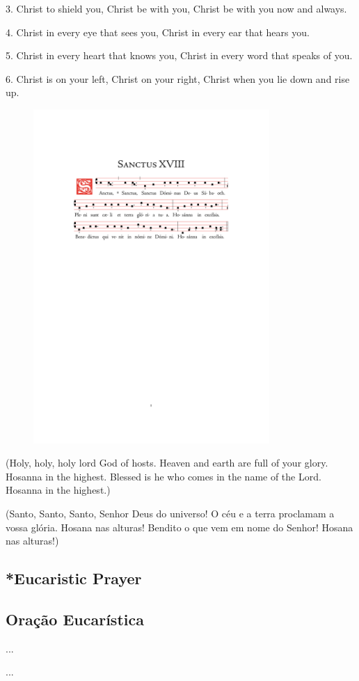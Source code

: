 \documentclass[10pt,a4]{article}
\newcommand \subsect[2] {\subsection*{#1} \switchcolumn \subsection*{#2} \switchcolumn*}
\begin{document}
3. Christ to shield you, Christ be with you,
Christ be with you now and always.

4. Christ in every eye that sees you,
Christ in every ear that hears you.

5. Christ in every heart that knows you,
Christ in every word that speaks of you.

6. Christ is on your left, Christ on your right,
Christ when you lie down and rise up.

\begin{figure}[h!]
	\centering
	\includegraphics[trim = 35mm 175mm 35.5mm 45mm, clip, width = 0.8\textwidth]{scores/Sanctus-XVIII.pdf}
\end{figure}

\begin{paracol}{2}

(Holy, holy, holy lord God of hosts.
Heaven and earth are full of your glory.
Hosanna in the highest.
Blessed is he who comes in the name of the Lord.
Hosanna in the highest.)

\switchcolumn
(Santo, Santo, Santo, Senhor Deus do universo! O céu e a terra proclamam a vossa glória. 
Hosana nas alturas! Bendito o que vem em nome do Senhor! Hosana nas alturas!)

\switchcolumn*

\subsect{*Eucaristic Prayer}{Ora\c{c}\~ao Eucar\'istica}

...


\switchcolumn

...


\end{paracol}
\end{document}
